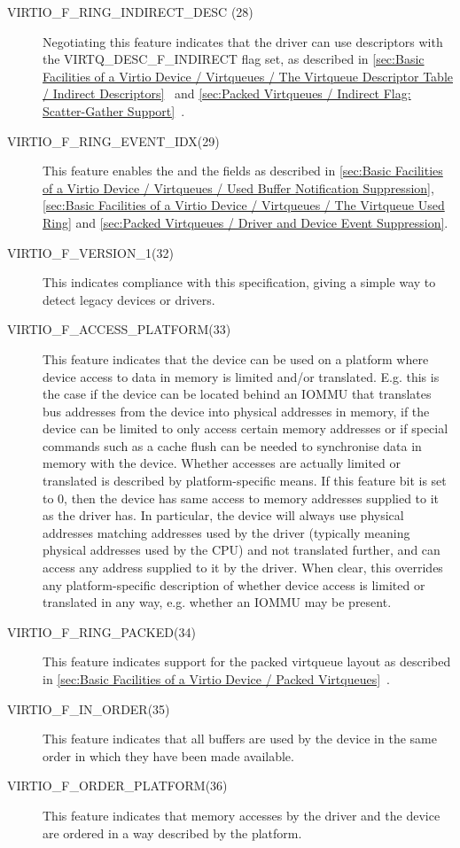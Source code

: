 \begin{description}
  \item[VIRTIO_F_RING_INDIRECT_DESC (28)] Negotiating this feature indicates
  that the driver can use descriptors with the VIRTQ_DESC_F_INDIRECT
  flag set, as described in \ref{sec:Basic Facilities of a Virtio
Device / Virtqueues / The Virtqueue Descriptor Table / Indirect
Descriptors}~ and \ref{sec:Packed Virtqueues / Indirect Flag: Scatter-Gather Support}~.
  \item[VIRTIO_F_RING_EVENT_IDX(29)] This feature enables the 
  and the  fields as described in
\ref{sec:Basic Facilities of a Virtio Device / Virtqueues / Used Buffer Notification Suppression}, \ref{sec:Basic Facilities of a Virtio Device / Virtqueues / The Virtqueue Used Ring} and \ref{sec:Packed Virtqueues / Driver and Device Event Suppression}.


  \item[VIRTIO_F_VERSION_1(32)] This indicates compliance with this
    specification, giving a simple way to detect legacy devices or drivers.

  \item[VIRTIO_F_ACCESS_PLATFORM(33)] This feature indicates that
  the device can be used on a platform where device access to data
  in memory is limited and/or translated. E.g. this is the case if the device can be located
  behind an IOMMU that translates bus addresses from the device into physical
  addresses in memory, if the device can be limited to only access
  certain memory addresses or if special commands such as
  a cache flush can be needed to synchronise data in memory with
  the device. Whether accesses are actually limited or translated
  is described by platform-specific means.
  If this feature bit is set to 0, then the device
  has same access to memory addresses supplied to it as the
  driver has.
  In particular, the device will always use physical addresses
  matching addresses used by the driver (typically meaning
  physical addresses used by the CPU)
  and not translated further, and can access any address supplied to it by
  the driver. When clear, this overrides any platform-specific description of
  whether device access is limited or translated in any way, e.g.
  whether an IOMMU may be present.
  \item[VIRTIO_F_RING_PACKED(34)] This feature indicates
  support for the packed virtqueue layout as described in
  \ref{sec:Basic Facilities of a Virtio Device / Packed Virtqueues}~.
  \item[VIRTIO_F_IN_ORDER(35)] This feature indicates
  that all buffers are used by the device in the same
  order in which they have been made available.
  \item[VIRTIO_F_ORDER_PLATFORM(36)] This feature indicates
  that memory accesses by the driver and the device are ordered
  in a way described by the platform.


\end{description}
